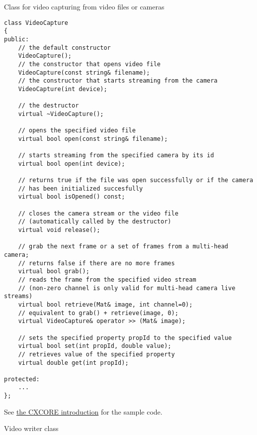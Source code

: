 Class for video capturing from video files or cameras

\begin{lstlisting}
class VideoCapture
{
public:
    // the default constructor
    VideoCapture();
    // the constructor that opens video file
    VideoCapture(const string& filename);
    // the constructor that starts streaming from the camera
    VideoCapture(int device);
    
    // the destructor
    virtual ~VideoCapture();
    
    // opens the specified video file
    virtual bool open(const string& filename);
    
    // starts streaming from the specified camera by its id
    virtual bool open(int device);
    
    // returns true if the file was open successfully or if the camera
    // has been initialized succesfully
    virtual bool isOpened() const;
    
    // closes the camera stream or the video file
    // (automatically called by the destructor)
    virtual void release();
    
    // grab the next frame or a set of frames from a multi-head camera;
    // returns false if there are no more frames
    virtual bool grab();
    // reads the frame from the specified video stream
    // (non-zero channel is only valid for multi-head camera live streams)
    virtual bool retrieve(Mat& image, int channel=0);
    // equivalent to grab() + retrieve(image, 0);
    virtual VideoCapture& operator >> (Mat& image);
    
    // sets the specified property propId to the specified value 
    virtual bool set(int propId, double value);
    // retrieves value of the specified property
    virtual double get(int propId);
    
protected:
    ...
};
\end{lstlisting}

See \hyperref[AutomaticMemoryManagement2]{the CXCORE introduction} for the sample code.

Video writer class

